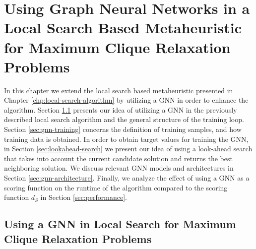 \documentclass[draft,final]{vutinfth} %
\begin{document}
\chapter{Using Graph Neural Networks in a Local Search Based Metaheuristic for Maximum Clique Relaxation Problems}\label{chp:gnn}

In this chapter we extend the local search based metaheuristic presented in Chapter \ref{chp:local-search-algorithm} by utilizing a GNN in order to enhance the algorithm. 
Section \ref{sec:gnn-local-search} presents our idea of utilizing a GNN in the previously described local search algorithm and the general structure of the training loop. 
Section \ref{sec:gnn-training} concerns the definition of training samples, and how training data is obtained. 
In order to obtain target values for training the GNN, in Section \ref{sec:lookahead-search} we present our idea of using a look-ahead search that takes into account the current candidate solution and returns the best neighboring solution. 
We discuss relevant GNN models and architectures in Section \ref{sec:gnn-architecture}. 
Finally, we analyze the effect of using a GNN as a scoring function on the runtime of the algorithm compared to the scoring function $d_S$ in Section \ref{sec:performance}. 


\section{Using a GNN in Local Search for Maximum Clique Relaxation Problems}\label{sec:gnn-local-search}
\end{document}
